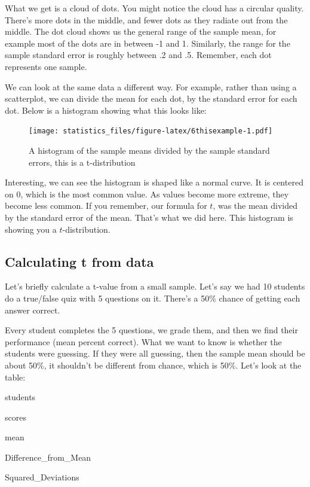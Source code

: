 \documentclass[]{book}
\begin{document}
What we get is a cloud of dots. You might notice the cloud has a circular quality. There's more dots in the middle, and fewer dots as they radiate out from the middle. The dot cloud shows us the general range of the sample mean, for example most of the dots are in between -1 and 1. Similarly, the range for the sample standard error is roughly between .2 and .5. Remember, each dot represents one sample.

We can look at the same data a different way. For example, rather than using a scatterplot, we can divide the mean for each dot, by the standard error for each dot. Below is a histogram showing what this looks like:

\begin{figure}
\centering
\texttt{[image: statistics\_files/figure-latex/6thisexample-1.pdf]}
\caption{\label{fig:6thisexample}A histogram of the sample means divided by the sample standard errors, this is a t-distribution}
\end{figure}

Interesting, we can see the histogram is shaped like a normal curve. It is centered on 0, which is the most common value. As values become more extreme, they become less common. If you remember, our formula for \(t\), was the mean divided by the standard error of the mean. That's what we did here. This histogram is showing you a \(t\)-distribution.

\hypertarget{calculating-t-from-data}{%
\subsection{Calculating t from data}\label{calculating-t-from-data}}

Let's briefly calculate a t-value from a small sample. Let's say we had 10 students do a true/false quiz with 5 questions on it. There's a 50\% chance of getting each answer correct.

Every student completes the 5 questions, we grade them, and then we find their performance (mean percent correct). What we want to know is whether the students were guessing. If they were all guessing, then the sample mean should be about 50\%, it shouldn't be different from chance, which is 50\%. Let's look at the table:

students

scores

mean

Difference\_from\_Mean

Squared\_Deviations
\end{document}
